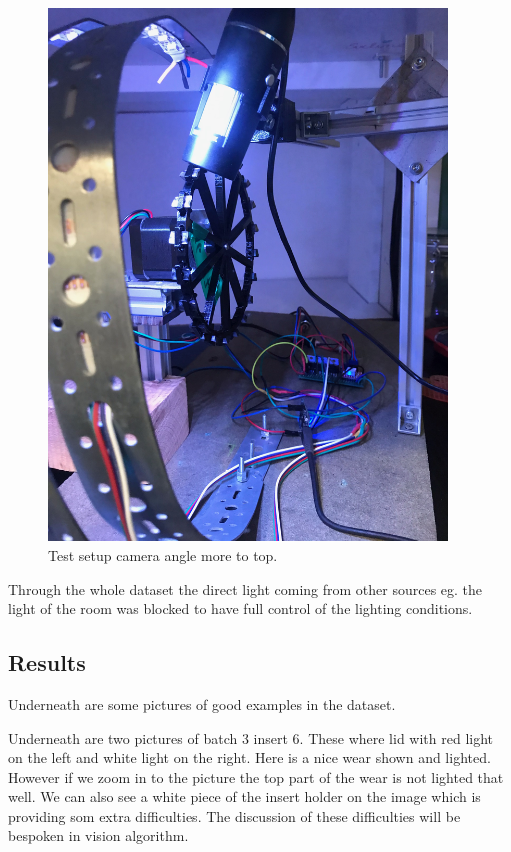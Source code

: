 \begin{figure}[hbtp]
\centering
	\includegraphics[width=4.166667in, keepaspectratio=true,angle=270]{./fig/Vision/Dataset/automated_datasets/2_created_datasets/2_Spaghetti_dataset/IMG_9296.jpeg}
	\caption{Test setup camera angle more to top.}
	\label{fig:impl:sd:setup:top}
\end{figure}



Through the whole dataset the direct light coming from other sources eg. the light of the room was blocked to have full control of the lighting conditions.



\subsection{Results}

Underneath are some pictures of good examples in the dataset.



Underneath are two pictures of batch 3 insert 6. These where lid with red light on the left and white light on the right. Here is a nice wear shown and lighted. However if we zoom in to the picture the top part of the wear is not lighted that well. We can also see a white piece of the insert holder on the image which is providing som extra difficulties. The discussion of these difficulties will be bespoken in vision algorithm.

